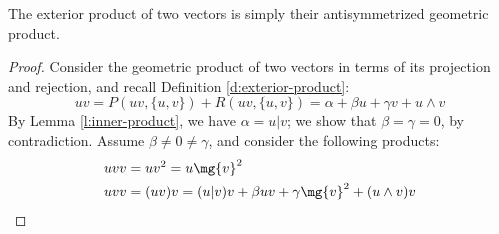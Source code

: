 \begin{lemma}\label{l:exterior-product}
	The exterior product of two vectors is simply their antisymmetrized geometric product.
\end{lemma}
\begin{proof}
	Consider the geometric product of two vectors in terms of its projection and rejection, and recall Definition \ref{d:exterior-product}:
	\[uv = P(uv, \{u,v\}) + R(uv, \{u,v\}) = \alpha + \beta u + \gamma v + u \wedge v\]
	By Lemma \ref{l:inner-product}, we have $\alpha = u | v$; we show that $\beta = \gamma = 0$, by contradiction. Assume $\beta \neq 0 \neq \gamma$, and consider the following products:
	\begin{align*}
		&uvv = uv^2 = u\mg{v}^2 \\
		&uvv = (uv)v = (u | v)v + \beta uv + \gamma \mg{v}^2 + (u \wedge v)v
	\end{align*}

\end{proof}
